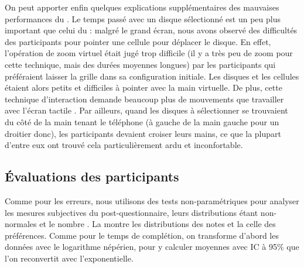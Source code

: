 On peut apporter enfin quelques explications supplémentaires des mauvaises performances du . Le temps passé avec un disque sélectionné est un peu plus important que celui du  : malgré le grand écran, nous avons observé des difficultés des participants pour pointer une cellule pour déplacer le disque. En effet, l'opération de zoom virtuel était jugé trop difficile (il y a très peu de zoom pour cette technique, mais des durées moyennes longues) par les participants qui préféraient laisser la grille dans sa configuration initiale. Les disques et les cellules étaient alors petits et difficiles à pointer avec la main virtuelle. De plus, cette technique d'interaction demande beaucoup plus de mouvements que travailler avec l'écran tactile . Par ailleurs, quand les disques à sélectionner se trouvaient du côté de la main tenant le téléphone (à gauche de la main gauche pour un droitier donc), les participants devaient croiser leurs mains, ce que la plupart d'entre eux ont trouvé cela particulièrement ardu et inconfortable.


\subsection{Évaluations des participants}
\label{subsec:experiment_results_evaluations}



Comme pour les erreurs, nous utilisons des tests non-paramétriques pour analyser les mesures subjectives du post-questionnaire, leurs distributions étant non-normales et le nombre \cite{Wobbrock2016}. La  montre les distributions des notes et la  celle des préférences. Comme pour le temps de complétion, on transforme d'abord les données avec le logarithme népérien, pour y calculer moyennes avec IC à 95\% que l'on reconvertit avec l'exponentielle.

